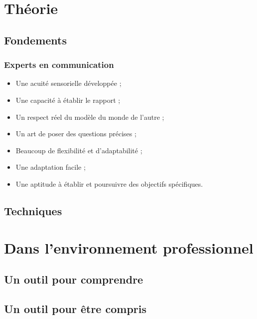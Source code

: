 \documentclass{beamer}
\begin{document}
\section{Théorie}
\subsection{Fondements}
\begin{frame}[t]\frametitle{Experts en communication}
	\begin{itemize}
		\item Une acuité sensorielle développée ;
		\item Une capacité à établir le rapport ;
		\item Un respect réel du modèle du monde de l'autre ;
		\item Un art de poser des questions précises ;
		\item Beaucoup de flexibilité et d'adaptabilité ;
		\item Une adaptation facile ;
		\item Une aptitude à établir et poursuivre des objectifs spécifiques.
	\end{itemize}
\end{frame}
\subsection{Techniques}

\section{Dans l'environnement professionnel}
\subsection{Un outil pour comprendre}
\subsection{Un outil pour être compris}
\end{document}
